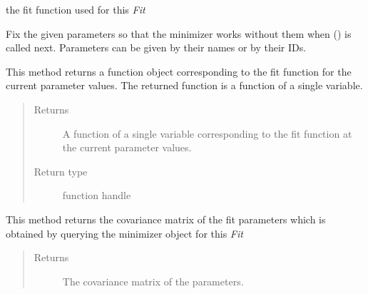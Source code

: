 \documentclass[a4paper,10pt,english]{sphinxmanual}
\begin{document}
\begin{fulllineitems}
\begin{fulllineitems}
\end{fulllineitems}


\begin{fulllineitems}
\label{module_doc:kafe.fit.Fit.fit_function}
the fit function used for this \emph{Fit}

\end{fulllineitems}


\begin{fulllineitems}
\label{module_doc:kafe.fit.Fit.fix_parameters}
Fix the given parameters so that the minimizer works without them
when {\hyperref[module_doc:kafe.fit.Fit.do_fit]{\emph{}}} () is called next. Parameters can be
given by their names or by their IDs.

\end{fulllineitems}


\begin{fulllineitems}
\label{module_doc:kafe.fit.Fit.get_current_fit_function}
This method returns a function object corresponding to the fit function
for the current parameter values. The returned function is a function
of a single variable.
\begin{quote}\begin{description}
\item[{Returns}] \leavevmode
A function of a single variable corresponding to the fit function
at the current parameter values.

\item[{Return type}] \leavevmode
function handle

\end{description}\end{quote}

\end{fulllineitems}


\begin{fulllineitems}
\label{module_doc:kafe.fit.Fit.get_error_matrix}
This method returns the covariance matrix of the fit parameters which
is obtained by querying the minimizer object for this \emph{Fit}
\begin{quote}\begin{description}
\item[{Returns}] \leavevmode
The covariance matrix of the parameters.


\end{description}
\end{quote}
\end{fulllineitems}
\end{fulllineitems}
\end{document}
